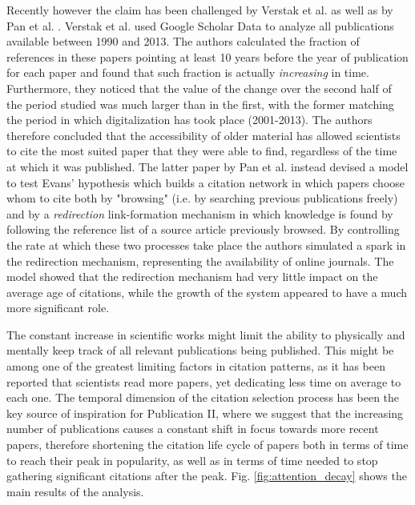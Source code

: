Recently however the claim has been challenged by Verstak et al. \cite{DBLP:journals/corr/VerstakASHILS14} as well as by Pan et al. \cite{DBLP:journals/corr/PanPPF16}.
Verstak et al. used Google Scholar Data to analyze all publications available between 1990 and 2013. The authors calculated the fraction of references in these papers pointing at least 10 years before the year of publication
for each paper and found that such fraction is actually \textit{increasing} in time. Furthermore, they noticed that the value of the change over the second half of the period 
studied was much larger than in the first,
with the former matching the period in which digitalization has took place (2001-2013). The authors therefore concluded that the accessibility of older material has allowed scientists to cite the most suited paper that they were
able to find, regardless of the time at which it was published. The latter paper by Pan et al. instead devised a model to test Evans' hypothesis which builds a citation network in which papers choose whom to cite 
both by "browsing" (i.e. by searching previous publications freely) and by a \textit{redirection} link-formation mechanism in which knowledge is found
by following the reference list of a source article previously browsed. By controlling the rate at which these two processes take place the authors
simulated a spark in the redirection mechanism, representing the availability of online journals. The model showed that the redirection mechanism had very little impact on the average age of citations, while the growth of the system
appeared to have a much more significant role. 

The constant increase in scientific works might limit the ability to physically and mentally keep track of all relevant publications being published. This might be among one of the
greatest limiting factors in citation patterns, as it has been reported 
 \cite{doi:10.1108/00012530910932267} that scientists read more papers, yet
dedicating less time on average to each one. 
The temporal dimension of the 
citation selection process has been the key source of inspiration for Publication II, where we suggest that the increasing number of publications causes a constant shift in focus towards more recent papers, therefore
shortening the citation life cycle of papers both in terms of time to reach their peak in popularity, as well as in terms of time needed to stop gathering significant citations after the peak. Fig. \ref{fig:attention_decay} shows the main results
of the analysis.

